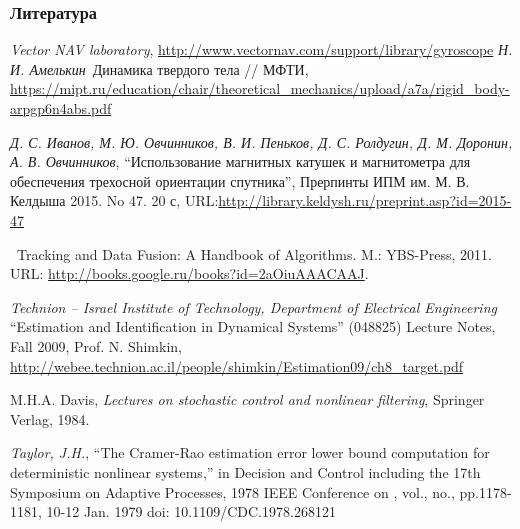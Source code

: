 \documentclass[utf8]{beamer}
\begin{document}
\begin{frame}
\frametitle{Литература}
\tiny
\begin{thebibliography}{99}
{\it Vector NAV laboratory}, \url{http://www.vectornav.com/support/library/gyroscope}
{\it Н. И. Амелькин}\,
Динамика твердого тела // МФТИ,
\url{https://mipt.ru/education/chair/theoretical_mechanics/upload/a7a/rigid_body-arpgp6n4abs.pdf}

    {\it Д. С. Иванов, М. Ю. Овчинников, В. И. Пеньков, Д. С. Ролдугин, Д. М.
Доронин, А. В. Овчинников}, ``Использование магнитных катушек и магнитометра для
обеспечения трехосной ориентации спутника'', Прерпинты ИПМ им. М. В. Келдыша
2015. No 47. 20 с, URL:\url{http://library.keldysh.ru/preprint.asp?id=2015-47}

\, Tracking and Data Fusion: A Handbook of Algorithms. M.: YBS-Press, 2011.
URL: \url{http://books.google.ru/books?id=2aOiuAAACAAJ}.

 {\it Technion – Israel Institute of Technology,
    Department of Electrical Engineering} ``Estimation and Identification in
    Dynamical Systems'' (048825)
    Lecture Notes, Fall 2009, Prof. N. Shimkin, \url{http://webee.technion.ac.il/people/shimkin/Estimation09/ch8_target.pdf}

    M.H.A. Davis, {\it Lectures on stochastic control and nonlinear
    filtering}, Springer Verlag, 1984.

{\it Taylor, J.H.}, ``The Cramer-Rao estimation error lower bound computation
for deterministic nonlinear systems,'' in Decision and Control including the 17th Symposium on Adaptive Processes, 1978 IEEE Conference on , vol., no., pp.1178-1181, 10-12 Jan. 1979
doi: 10.1109/CDC.1978.268121
\end{thebibliography}
\end{frame}
\end{document}
